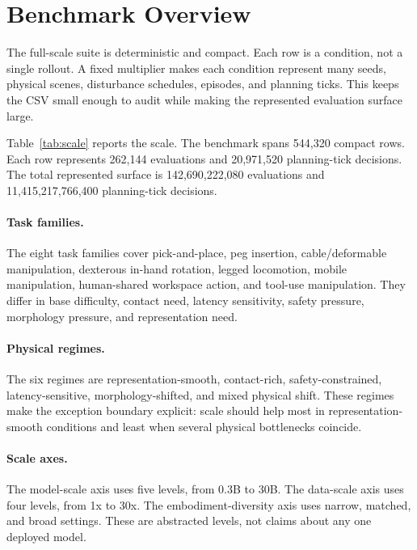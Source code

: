 \documentclass{article}
\begin{document}
\section{Benchmark Overview}

The full-scale suite is deterministic and compact. Each row is a condition, not a single rollout. A fixed multiplier makes each condition represent many seeds, physical scenes, disturbance schedules, episodes, and planning ticks. This keeps the CSV small enough to audit while making the represented evaluation surface large.

\begin{table}[t]
\centering
\small
\resizebox{\linewidth}{!}{}
\caption{Full-scale benchmark size. Compact rows are streamed to disk and summarized online.}
\label{tab:scale}
\end{table}

Table~\ref{tab:scale} reports the scale. The benchmark spans 544,320 compact rows. Each row represents 262,144 evaluations and 20,971,520 planning-tick decisions. The total represented surface is 142,690,222,080 evaluations and 11,415,217,766,400 planning-tick decisions.

\paragraph{Task families.}
The eight task families cover pick-and-place, peg insertion, cable/deformable manipulation, dexterous in-hand rotation, legged locomotion, mobile manipulation, human-shared workspace action, and tool-use manipulation. They differ in base difficulty, contact need, latency sensitivity, safety pressure, morphology pressure, and representation need.

\paragraph{Physical regimes.}
The six regimes are representation-smooth, contact-rich, safety-constrained, latency-sensitive, morphology-shifted, and mixed physical shift. These regimes make the exception boundary explicit: scale should help most in representation-smooth conditions and least when several physical bottlenecks coincide.

\paragraph{Scale axes.}
The model-scale axis uses five levels, from 0.3B to 30B. The data-scale axis uses four levels, from 1x to 30x. The embodiment-diversity axis uses narrow, matched, and broad settings. These are abstracted levels, not claims about any one deployed model.
\end{document}
